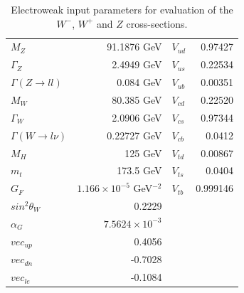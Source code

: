 \begin{table}[tb]
  \begin{center}
\begin{tabular}{lrlr}
\hline
\hline
    $M_Z$                       & 91.1876 GeV                        & $V_{ud}$      & 0.97427  \\
    $\Gamma_Z$                  & 2.4949 GeV                            & $V_{us}$      & 0.22534  \\
    $\Gamma(Z \rightarrow ll)$  & 0.084 GeV                             & $V_{ub}$      & 0.00351  \\
    $M_W$                       & 80.385 GeV                        & $V_{cd}$      & 0.22520  \\
    $\Gamma_W$                  & 2.0906 GeV                            & $V_{cs}$      & 0.97344  \\
    $\Gamma(W \rightarrow l\nu)$ & 0.22727 GeV                          & $V_{cb}$      & 0.0412   \\
    $M_H$                       & 125     GeV                        & $V_{td}$      & 0.00867  \\
    $m_t$                       & 173.5   GeV                        & $V_{ts}$      & 0.0404   \\
    $G_F$                       & $1.166 \times 10^{-5}$ GeV$^{-2}$ & $V_{tb}$      & 0.999146 \\
    $sin^2\theta_W$             & 0.2229                   &               &       \\
    $\alpha_G$                  & $7.5624 \times 10^{-3}$  &               &       \\
    $vec_{up}$                  & 0.4056                   &               &       \\
    $vec_{dn}$                  & -0.7028                  &               &       \\
    $vec_{le}$                  & -0.1084                  &               &       \\

    \hline
    \hline
    \end{tabular}
    \caption{Electroweak input parameters for evaluation of the $W^-$, $W^+$ and $Z$ cross-sections.}
    \label{tab:EW parameters}
  \end{center}
\end{table}

